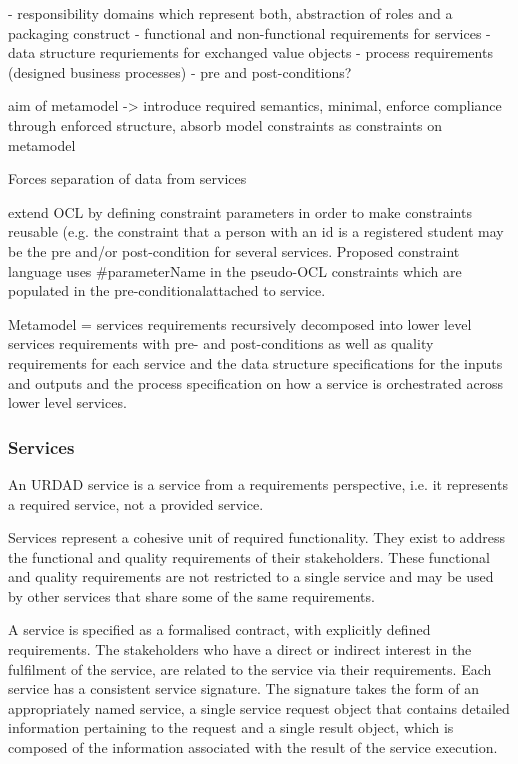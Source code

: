  - responsibility domains which represent both, abstraction of roles and a packaging construct
 - functional and non-functional requirements for services
 - data structure requriements for exchanged value objects
 - process requirements (designed business processes)
 - pre and post-conditions?


aim of metamodel -> introduce required semantics, minimal, enforce compliance through enforced structure, absorb model constraints as constraints on metamodel



Forces separation of data from services

extend OCL by defining constraint parameters  in order to make constraints reusable (e.g. the constraint that a
person with an id is a registered student may be the pre and/or post-condition for several services. Proposed
constraint language uses #parameterName in the pseudo-OCL constraints which are populated in the pre-conditionalattached to service.



Metamodel = services requirements recursively decomposed into lower level services requirements with pre- and post-conditions as well as quality requirements for each service and the data structure specifications for the inputs and outputs and the process specification on how a service is orchestrated across lower level services.




\subsubsection{Services}

An URDAD service is a service from a requirements perspective, i.e. it represents a required service, not a provided service. 


Services represent a cohesive unit of required functionality. They exist to address the functional and quality requirements of their stakeholders. These functional and quality requirements are not restricted to a single service and may be used by other services that share some of the same requirements.

A service is specified as a formalised contract, with explicitly defined requirements. The stakeholders who have a direct or indirect interest in the fulfilment of the service, are related to the service via their requirements. Each service has a consistent service signature. The signature takes the form of an appropriately named service, a single service request object that contains detailed information pertaining to the request and a single result object, which is composed of the information associated with the result of the service execution.

